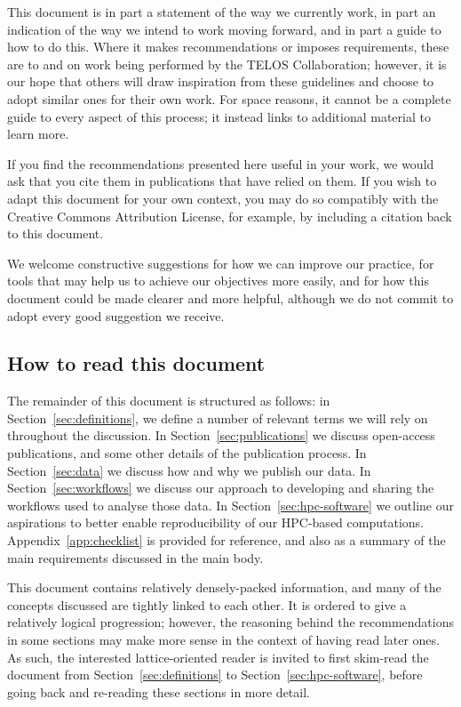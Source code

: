 \documentclass{article}
\begin{document}
This document is in part a statement of the way we currently work,
in part an indication of the way we intend to work moving forward,
and in part a guide to how to do this.
Where it makes recommendations or imposes requirements,
these are to and on work being performed by the TELOS Collaboration;
however,
it is our hope that others will draw inspiration from these guidelines
and choose to adopt similar ones for their own work.
For space reasons,
it cannot be a complete guide to every aspect of this process;
it instead links to additional material to learn more.

If you find the recommendations presented here useful in your work,
we would ask that you cite them in publications that have relied on them.
If you wish to adapt this document for your own context,
you may do so compatibly with the Creative Commons Attribution License,
for example,
by including a citation back to this document.

We welcome constructive suggestions for how we can improve our practice,
for tools that may help us to achieve our objectives more easily,
and for how this document could be made clearer and more helpful,
although we do not commit to adopt every good suggestion we receive.

\tableofcontents

\subsection{How to read this document}

The remainder of this document is structured as follows:
in Section~\ref{sec:definitions},
we define a number of relevant terms we will rely on throughout the discussion.
In Section~\ref{sec:publications} we discuss open-access publications,
and some other details of the publication process.
In Section~\ref{sec:data} we discuss how and why we publish our data.
In Section~\ref{sec:workflows} we discuss our approach to developing and sharing
the workflows used to analyse those data.
In Section~\ref{sec:hpc-software} we outline our aspirations to
better enable reproducibility of our HPC-based computations.
Appendix~\ref{app:checklist} is provided for reference,
and also as a summary of the main requirements discussed in the main body.

This document contains relatively densely-packed information,
and many of the concepts discussed are tightly linked to each other.
It is ordered to give a relatively logical progression;
however,
the reasoning behind the recommendations in some sections
may make more sense in the context of having read later ones.
As such,
the interested lattice-oriented reader is invited to first skim-read the document
from Section~\ref{sec:definitions} to Section~\ref{sec:hpc-software},
before going back and re-reading these sections in more detail.
\end{document}

